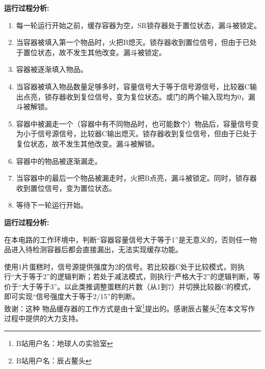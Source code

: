 \documentclass[UTF8,12pt,punct=kaiming,fontset=none]{ctexart}
\begin{document}
{\bfseries 运行过程分析:}
\begin{enumerate}
    \item 每一轮运行开始之前，缓存容器为空，SR锁存器处于置位状态，漏斗被锁定。
    \item 当容器被填入第一个物品时，火把B熄灭。锁存器收到置位信号，但由于已处于置位状态，故不发生其他改变。漏斗被锁定。
    \item 容器被逐渐填入物品。
    \item 当容器被填入物品数量足够多时，容量信号大于等于信号源信号，比较器C输出点亮，锁存器收到复位信号，变为复位状态。或门的两个输入现均为0，漏斗被解锁。
    \item 容器中被漏走一个（容器中有不同物品时，也可能数个）物品后，容量信号变为小于信号源信号，比较器C输出熄灭。锁存器收到复位信号，但由于已处于复位状态，故不发生其他改变。漏斗被解锁。
    \item 容器中的物品被逐渐漏走。
    \item 当容器中的最后一个物品被漏走时，火把B点亮，漏斗被锁定。同时，锁存器收到置位信号，变为置位状态。
    \item 等待下一轮运行开始。
\end{enumerate}

{\bfseries 运行过程分析:}

在本电路的工作环境中，判断“容器容量信号大于等于1”是无意义的，否则任一物品进入待检测容器后都会直接漏出，无法实现缓存功能。

使用1片蛋糕时，信号源提供强度为2的信号。若比较器C处于比较模式，则执行“大于等于2”的逻辑判断；若处于减法模式，则执行“严格大于2”的逻辑判断，等价于“大于等于3”。以此类推调整蛋糕的片数（从1到7）并切换比较器C的模式，即可实现“信号强度大于等于2/15”的判断。
\\

致谢：这种
物品缓存器的工作方式是由十室\footnote{B站用户名：地球人の实验室}提出的。感谢辰占鳌头\footnote{B站用户名：辰占鳌头}在本文写作过程中提供的大力支持。
\end{document}
